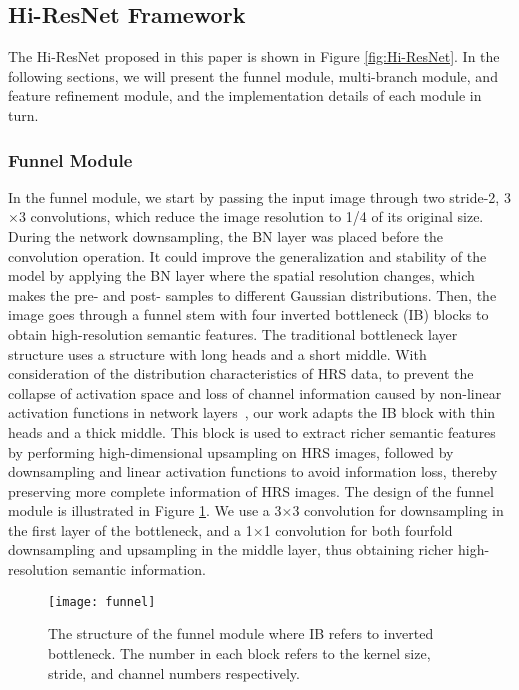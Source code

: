 \documentclass[journal]{IEEEtran}
\begin{document}
\subsection{Hi-ResNet Framework}
The Hi-ResNet proposed in this paper is shown in Figure \ref{fig:Hi-ResNet}. In the following sections, we will present the funnel module, multi-branch module, and feature refinement module, and the implementation details of each module in turn.

\subsubsection{Funnel Module}
In the funnel module, we start by passing the input image through two stride-2, 3$\times$3 convolutions, which reduce the image resolution to 1/4 of its original size. During the network downsampling, the BN layer was placed before the convolution operation. It could improve the generalization and stability of the model by applying the BN layer where the spatial resolution changes, which makes the pre- and post- samples to different Gaussian distributions. Then, the image goes through a funnel stem with four inverted bottleneck (IB) blocks to obtain high-resolution semantic features. The traditional bottleneck layer structure uses a structure with long heads and a short middle. With consideration of the distribution characteristics of HRS data, to prevent the collapse of activation space and loss of channel information caused by non-linear activation functions in network layers~\cite{sandler2018mobilenetv2}, our work adapts the IB block with thin heads and a thick middle. This block is used to extract richer semantic features by performing high-dimensional upsampling on HRS images, followed by downsampling and linear activation functions to avoid information loss, thereby preserving more complete information of HRS images. The design of the funnel module is illustrated in Figure \ref{fig:funnel}. We use a 3$\times$3 convolution for downsampling in the first layer of the bottleneck, and a 1$\times$1 convolution for both fourfold downsampling and upsampling in the middle layer, thus obtaining richer high-resolution semantic information.

\begin{figure}[!ht]
    \centering
    \texttt{[image: funnel]}
    \caption{The structure of the funnel module where IB refers to inverted bottleneck. The number in each block refers to the kernel size, stride, and channel numbers respectively.}
    \label{fig:funnel}
\end{figure}
\end{document}
